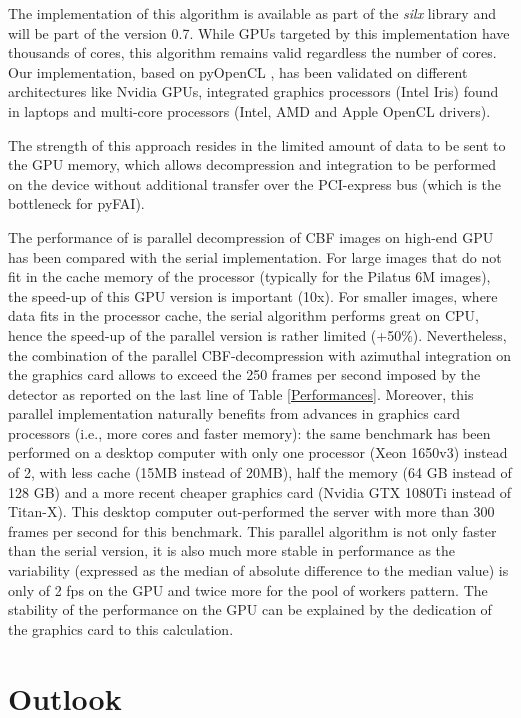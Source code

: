\documentclass[preprint]{iucr}              %
\begin{document}
The implementation of this algorithm is available as part of the \textit{silx}
\cite{silx} library and will be part of the version 0.7.
While GPUs targeted by this implementation have thousands of
cores, this algorithm remains valid regardless the
number of cores.
Our implementation, based on pyOpenCL \cite{pyopencl}, 
has been validated on different architectures like Nvidia GPUs,
integrated graphics processors (Intel Iris) found in laptops and multi-core
processors (Intel, AMD and Apple OpenCL drivers).

The strength of this approach resides in the limited amount of
data to be sent to the GPU memory, which allows decompression and
integration to be performed on the device without additional
transfer over the PCI-express bus (which is the bottleneck for pyFAI).

The performance of is parallel decompression of CBF images on high-end GPU has
been compared with the serial implementation. 
For large images that do not fit in the cache memory of the
processor (typically for the Pilatus 6M images), the speed-up of this GPU
version is important (10x).
For smaller images, where data fits in the processor cache, the serial
algorithm performs great on CPU, hence the speed-up of the parallel version is
rather limited (+50\%). 
Nevertheless, the combination of the parallel CBF-decompression with azimuthal
integration on the graphics card allows to exceed the 250 frames per second
imposed by the detector as reported on the last line of Table
\ref{Performances}.
Moreover, this parallel implementation naturally benefits from advances in
graphics card processors (i.e., more cores and faster memory):
the same benchmark has been performed on a desktop computer with only one
processor (Xeon 1650v3) instead of 2, with less cache (15MB instead of 20MB),
half the memory (64 GB instead of 128 GB) and a more recent cheaper graphics card
(Nvidia GTX 1080Ti instead of Titan-X).
This desktop computer out-performed the server with more than
300 frames per second for this benchmark.
This parallel algorithm is not only faster than the serial version, it is also
much more stable in performance as the variability (expressed
as the median of absolute difference to the median value) is only of 2 fps on 
the GPU and twice more for the pool of workers pattern. 
The stability of the performance on the GPU can be explained by the dedication
of the graphics card to this calculation.

\section{Outlook}
\end{document}
